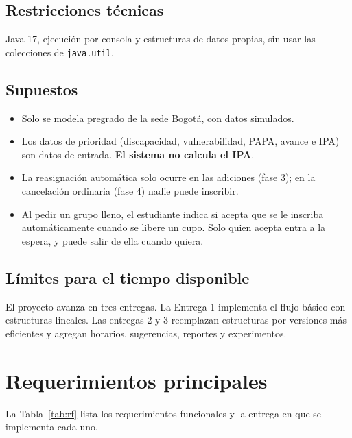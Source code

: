 \documentclass[conference]{IEEEtran}
\begin{document}
\subsection{Restricciones técnicas}
Java 17, ejecución por consola y estructuras de datos propias, sin usar las colecciones de \texttt{java.util}.

\subsection{Supuestos}
\begin{itemize}
    \item Solo se modela pregrado de la sede Bogotá, con datos simulados.
    \item Los datos de prioridad (discapacidad, vulnerabilidad, PAPA, avance e IPA) son datos de entrada. \textbf{El sistema no calcula el IPA}.
    \item La reasignación automática solo ocurre en las adiciones (fase 3); en la cancelación ordinaria (fase 4) nadie puede inscribir.
    \item Al pedir un grupo lleno, el estudiante indica si acepta que se le inscriba automáticamente cuando se libere un cupo. Solo quien acepta entra a la espera, y puede salir de ella cuando quiera.
\end{itemize}

\subsection{Límites para el tiempo disponible}
El proyecto avanza en tres entregas. La Entrega 1 implementa el flujo básico con estructuras lineales. Las entregas 2 y 3 reemplazan estructuras por versiones más eficientes y agregan horarios, sugerencias, reportes y experimentos.


\section{Requerimientos principales}

La Tabla~\ref{tab:rf} lista los requerimientos funcionales y la entrega en que se implementa cada uno.
\end{document}
